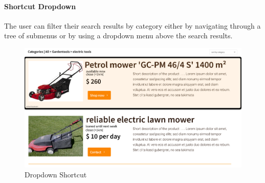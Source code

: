 	\paragraph{Shortcut Dropdown}
		The user can filter their search results by category either by navigating through a tree of submenus or by using a dropdown menu above the search results.
		\begin{figure}[H]
			\centering
			\includegraphics[width=0.5\linewidth]{abb/3_design_guidelines/dropdown_shortcut.png}
			\caption{Dropdown Shortcut}
			\label{fig:dropdown_shortcut}
			\centering
		\end{figure}
	\par
	
	
	
	